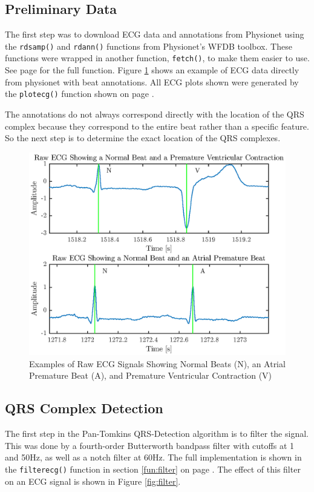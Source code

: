 \documentclass[titlepage,12pt,letter]{article}
\newcommand{\rpref}[1]{\ref{#1} on page \pageref{#1}}
\begin{document}
\subsection{Preliminary Data}
The first step was to download ECG data and annotations from Physionet using the
\verb`rdsamp()` and \verb`rdann()` functions from Physionet's WFDB toolbox.
\cite{Silva2014} These functions were wrapped in another function,
\verb`fetch()`, to make them easier to use.  See page \pageref{fun:fetch} for
the full function.  Figure \ref{fig:raw} shows an example of ECG data directly
from physionet with beat annotations.  All ECG plots shown were generated by the
\verb`plotecg()` function shown on page \pageref{fun:plotecg}.  

The annotations do not always
correspond directly with the location of the QRS complex because they correspond
to the entire beat rather than a specific feature.  So the next step is to
determine the exact location of the QRS complexes.  

\begin{figure}[hbtp]
    \centering
    \includegraphics[height=0.42\textheight]{../figures/figures_01}
    \caption{Examples of Raw ECG Signals Showing Normal Beats (N), an Atrial
    Premature Beat (A), and Premature Ventricular Contraction (V)}
    \label{fig:raw}
\end{figure}

\subsection{QRS Complex Detection}
The first step in the Pan-Tomkins QRS-Detection algorithm is to filter the
signal.  This was done by a fourth-order Butterworth bandpass filter with
cutoffs at 1 and 50Hz, as well as a notch filter at 60Hz.  The full
implementation is shown in the \verb`filterecg()` function in section
\rpref{fun:filter}.  The effect of this filter on an ECG signal is shown in
Figure \ref{fig:filter}.  
\end{document}
